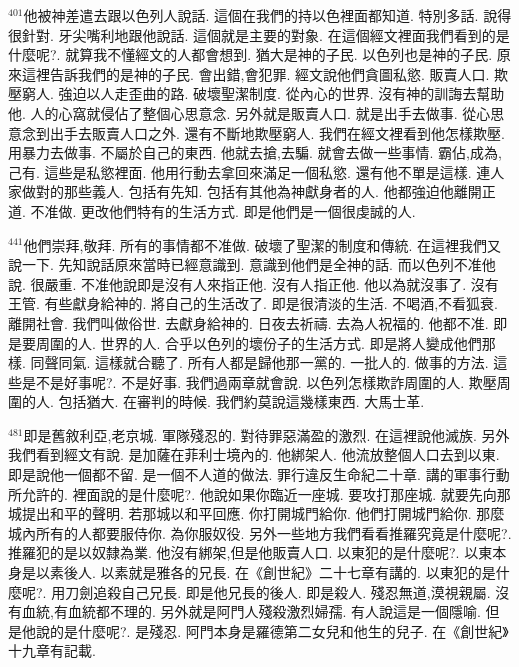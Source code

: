 \documentclass{book}
\begin{document}
$^{401}$他被神差遣去跟以色列人說話.
這個在我們的持以色裡面都知道.
特別多話.
說得很針對.
牙尖嘴利地跟他說話.
這個就是主要的對象.
在這個經文裡面我們看到的是什麼呢?.
就算我不懂經文的人都會想到.
猶大是神的子民.
以色列也是神的子民.
原來這裡告訴我們的是神的子民.
會出錯,會犯罪.
經文說他們貪圖私慾.
販賣人口.
欺壓窮人.
強迫以人走歪曲的路.
破壞聖潔制度.
從內心的世界.
沒有神的訓誨去幫助他.
人的心窩就侵佔了整個心思意念.
另外就是販賣人口.
就是出手去做事.
從心思意念到出手去販賣人口之外.
還有不斷地欺壓窮人.
我們在經文裡看到他怎樣欺壓.
用暴力去做事.
不屬於自己的東西.
他就去搶,去騙.
就會去做一些事情.
霸佔,成為,己有.
這些是私慾裡面.
他用行動去拿回來滿足一個私慾.
還有他不單是這樣.
連人家做對的那些義人.
包括有先知.
包括有其他為神獻身者的人.
他都強迫他離開正道.
不准做.
更改他們特有的生活方式.
即是他們是一個很虔誠的人.

$^{441}$他們崇拜,敬拜.
所有的事情都不准做.
破壞了聖潔的制度和傳統.
在這裡我們又說一下.
先知說話原來當時已經意識到.
意識到他們是全神的話.
而以色列不准他說.
很嚴重.
不准他說即是沒有人來指正他.
沒有人指正他.
他以為就沒事了.
沒有王管.
有些獻身給神的.
將自己的生活改了.
即是很清淡的生活.
不喝酒,不看狐衰.
離開社會.
我們叫做俗世.
去獻身給神的.
日夜去祈禱.
去為人祝福的.
他都不准.
即是要周圍的人.
世界的人.
合乎以色列的壞份子的生活方式.
即是將人變成他們那樣.
同聲同氣.
這樣就合聽了.
所有人都是歸他那一黨的.
一批人的.
做事的方法.
這些是不是好事呢?.
不是好事.
我們過兩章就會說.
以色列怎樣欺詐周圍的人.
欺壓周圍的人.
包括猶大.
在審判的時候.
我們約莫說這幾樣東西.
大馬士革.

$^{481}$即是舊敘利亞,老京城.
軍隊殘忍的.
對待罪惡滿盈的激烈.
在這裡說他滅族.
另外我們看到經文有說.
是加薩在菲利士境內的.
他綁架人.
他流放整個人口去到以東.
即是說他一個都不留.
是一個不人道的做法.
罪行違反生命紀二十章.
講的軍事行動所允許的.
裡面說的是什麼呢?.
他說如果你臨近一座城.
要攻打那座城.
就要先向那城提出和平的聲明.
若那城以和平回應.
你打開城門給你.
他們打開城門給你.
那麼城內所有的人都要服侍你.
為你服奴役.
另外一些地方我們看看推羅究竟是什麼呢?.
推羅犯的是以奴隸為業.
他沒有綁架,但是他販賣人口.
以東犯的是什麼呢?.
以東本身是以素後人.
以素就是雅各的兄長.
在《創世紀》二十七章有講的.
以東犯的是什麼呢?.
用刀劍追殺自己兄長.
即是他兄長的後人.
即是殺人.
殘忍無道,漠視親屬.
沒有血統,有血統都不理的.
另外就是阿門人殘殺激烈婦孺.
有人說這是一個隱喻.
但是他說的是什麼呢?.
是殘忍.
阿門本身是羅德第二女兒和他生的兒子.
在《創世紀》十九章有記載.
\end{document}
